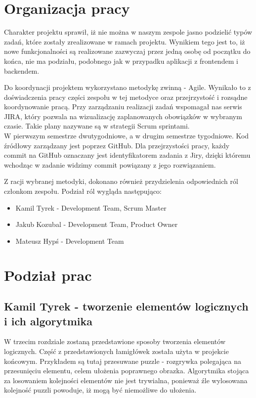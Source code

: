 \documentclass[oneside,polski,logo]{amuthesis}
\begin{document}
\section{Organizacja pracy}
Charakter projektu sprawił, iż nie można w naszym zespole jasno podzielić typów zadań, które zostały zrealizowane w ramach projektu. Wynikiem tego jest to, iż nowe funkcjonalności są realizowane zazwyczaj przez jedną osobę od początku do końca, nie ma podziału, podobnego jak w przypadku aplikacji z frontendem i backendem.

Do koordynacji projektem wykorzystano metodykę zwinną - Agile. Wynikało to z doświadczenia pracy części zespołu w tej metodyce oraz przejrzystość i rozsądne koordynowanie pracą. Przy zarządzaniu realizacji zadań wspomagał nas serwis JIRA, który pozwala na wizualizację zaplanowanych obowiązków w wybranym czasie. Takie plany nazywane są w strategii Scrum sprintami.\\ W pierwszym semestrze dwutygodniowe, a w drugim semestrze tygodniowe. Kod źródłowy zarządzany jest poprzez GitHub. Dla przejrzystości pracy, każdy commit na GitHub oznaczany jest identyfikatorem zadania z Jiry, dzięki któremu wchodząc w zadanie widzimy commit powiązany z jego rozwiązaniem. 

Z racji wybranej metodyki, dokonano również przydzielenia odpowiednich ról członkom zespołu. Podział ról wygląda następująco:

\begin{itemize}
	\item Kamil Tyrek - Development Team, Scrum Master
	\item Jakub Kozubal - Development Team, Product Owner
	\item Mateusz Hypś - Development Team
\end{itemize}

\section{Podział prac}
\subsection{Kamil Tyrek - tworzenie elementów logicznych i ich algorytmika}
W trzecim rozdziale zostaną przedstawione sposoby tworzenia elementów logicznych. Część z przedstawionych łamigłówek została użyta w projekcie końcowym. Przykładem są tutaj przesuwane puzzle - rozgrywka polegająca na przesunięciu elementu, celem ułożenia poprawnego obrazka. Algorytmika stojąca za losowaniem kolejności elementów nie jest trywialna, ponieważ źle wylosowana kolejność puzzli powoduje, iż mogą być niemożliwe do ułożenia.
\end{document}
